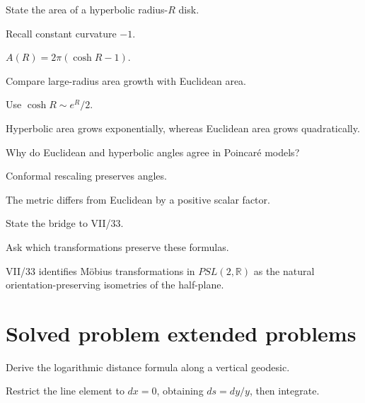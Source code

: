 \begin{exercise}\label{exr:vii32-21}
State the area of a hyperbolic radius-\(R\) disk.
\end{exercise}
\begin{hint}
Recall constant curvature \(-1\).
\end{hint}
\begin{solution}
\(A(R)=2\pi(\cosh R-1)\).
\end{solution}

\begin{exercise}\label{exr:vii32-22}
Compare large-radius area growth with Euclidean area.
\end{exercise}
\begin{hint}
Use \(\cosh R\sim e^R/2\).
\end{hint}
\begin{solution}
Hyperbolic area grows exponentially, whereas Euclidean area grows quadratically.
\end{solution}

\begin{exercise}\label{exr:vii32-23}
Why do Euclidean and hyperbolic angles agree in Poincaré models?
\end{exercise}
\begin{hint}
Conformal rescaling preserves angles.
\end{hint}
\begin{solution}
The metric differs from Euclidean by a positive scalar factor.
\end{solution}

\begin{exercise}\label{exr:vii32-24}
State the bridge to VII/33.
\end{exercise}
\begin{hint}
Ask which transformations preserve these formulas.
\end{hint}
\begin{solution}
VII/33 identifies Möbius transformations in \(PSL(2,\mathbb R)\) as the natural orientation-preserving isometries of the half-plane.
\end{solution}

\section{Solved problem extended problems}
\begin{problem}\label{prob:vii32-01}
Derive the logarithmic distance formula along a vertical geodesic.
\end{problem}
\begin{solution}
Restrict the line element to \(dx=0\), obtaining \(ds=dy/y\), then integrate.
\end{solution}


